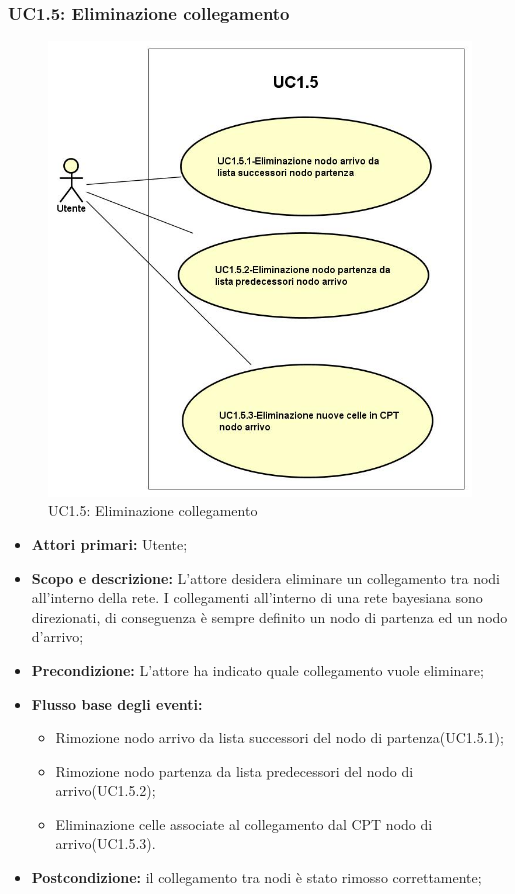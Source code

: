 \subsubsection{UC1.5: Eliminazione collegamento} 
\begin{figure} [H]
	\centering
	\includegraphics[scale=0.45]{Img/UC1-5} 
	\caption{UC1.5: Eliminazione collegamento} \label{} 
\end{figure} 
\begin{itemize} 
	\item{\textbf{Attori primari:} Utente;} 
	\item{\textbf{Scopo e descrizione:} L'attore desidera eliminare un collegamento tra nodi all'interno della rete. I collegamenti all'interno di una rete bayesiana sono direzionati, di conseguenza è sempre definito un nodo di partenza ed un nodo d'arrivo;} 
	\item{\textbf{Precondizione:} L'attore ha indicato quale collegamento vuole eliminare;} 
	\item{\textbf{Flusso base degli eventi:} } 
		\begin{itemize} 
			\item{Rimozione nodo arrivo da lista successori del nodo di partenza(UC1.5.1);} 
			\item{Rimozione nodo partenza da lista predecessori del nodo di arrivo(UC1.5.2);} 
			\item{Eliminazione celle associate al collegamento dal CPT nodo di arrivo(UC1.5.3).} 
		\end{itemize} 
	\item{\textbf{Postcondizione:} il collegamento tra nodi è stato rimosso correttamente;} 
\end{itemize} 
